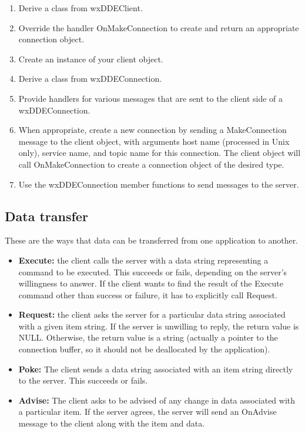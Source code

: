 \begin{enumerate}\itemsep=0pt
\item Derive a class from wxDDEClient.
\item Override the handler OnMakeConnection to create and return
an appropriate connection object.
\item Create an instance of your client object.
\item Derive a class from wxDDEConnection.
\item Provide handlers for various messages that are sent to the client
side of a wxDDEConnection.
\item When appropriate, create a new connection by sending a MakeConnection
message to the client object, with arguments host name (processed in Unix only),
service name, and topic name for this connection. The client object will call OnMakeConnection
to create a connection object of the desired type.
\item Use the wxDDEConnection member functions to send messages to the server.
\end{enumerate}

\subsection{Data transfer}

These are the ways that data can be transferred from one application to
another.

\begin{itemize}\itemsep=0pt
\item {\bf Execute:} the client calls the server with a data string representing
a command to be executed. This succeeds or fails, depending on the
server's willingness to answer. If the client wants to find the result
of the Execute command other than success or failure, it has to explicitly
call Request.
\item {\bf Request:} the client asks the server for a particular data string
associated with a given item string. If the server is unwilling to
reply, the return value is NULL. Otherwise, the return value is a string
(actually a pointer to the connection buffer, so it should not be
deallocated by the application).
\item {\bf Poke:} The client sends a data string associated with an item
string directly to the server. This succeeds or fails.
\item {\bf Advise:} The client asks to be advised of any change in data
associated with a particular item. If the server agrees, the server will
send an OnAdvise message to the client along with the item and data.
\end{itemize}

